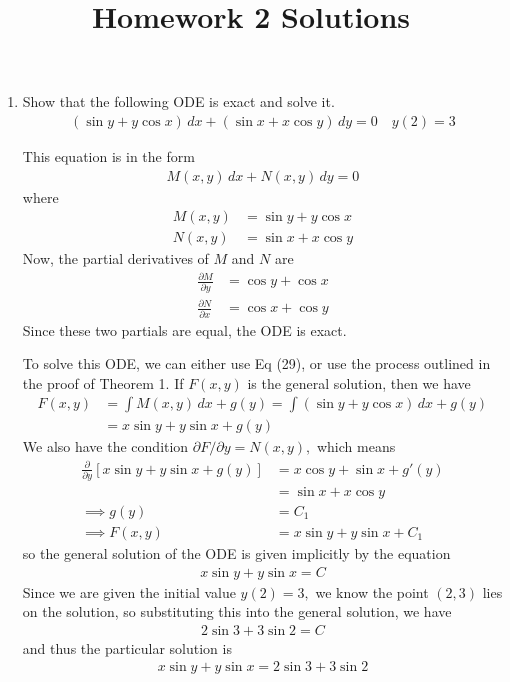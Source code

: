 \documentclass{article}
\begin{document}
\title{Homework 2 Solutions}
\maketitle
\thispagestyle{fancy}

\begin{enumerate}
	\item Show that the following ODE is exact and solve it.
		\begin{align*}
			(\sin y + y\cos x)\, dx + (\sin x + x\cos y)\, dy = 0 \quad y(2)=3
		\end{align*}
		\begin{soln}
			This equation is in the form
			\begin{align*}
				M(x, y)\, dx + N(x, y)\, dy = 0
			\end{align*}
			where
			\begin{align*}
				M(x, y) &= \sin y + y\cos x \\ 
				N(x, y) &= \sin x + x\cos y
			\end{align*}
			Now, the partial derivatives of $M$ and $N$ are
			\begin{align*}
				\frac{\partial M}{\partial y} &= \cos y + \cos x \\
				\frac{\partial N}{\partial x} &= \cos x + \cos y
			\end{align*}
			Since these two partials are equal, the ODE is exact. 

			To solve this ODE, we can either use Eq (29), or use the process outlined in the proof of Theorem 1. If $F(x, y)$ is the general solution, then we have
			\begin{align*}
				F(x, y) &= \int M(x, y)\, dx + g(y) = \int (\sin y + y\cos x)\, dx + g(y) \\
				&= x\sin y + y\sin x + g(y)
			\end{align*}
			We also have the condition $\partial F/\partial y = N(x, y),$ which means
			\begin{align*}
				\frac{\partial}{\partial y} \left[ x\sin y + y\sin x + g(y) \right] &= x\cos y + \sin x + g'(y) \\
				&= \sin x + x\cos y \\ 
				\implies g(y) &= C_1 \\
				\implies F(x, y) &= x\sin y + y\sin x + C_1
			\end{align*}
			so the general solution of the ODE is given implicitly by the equation
			\begin{align*}
				x\sin y + y\sin x = C
			\end{align*}
			Since we are given the initial value $y(2)=3,$ we know the point $(2, 3)$ lies on the solution, so substituting this into the general solution, we have
			\begin{align*}
				2\sin 3 + 3\sin 2 = C
			\end{align*}
			and thus the particular solution is 
			\begin{align*}
				\boxed{x\sin y + y\sin x = 2\sin 3 + 3\sin 2}
			\end{align*}
		\end{soln}


\end{enumerate}
\end{document}

